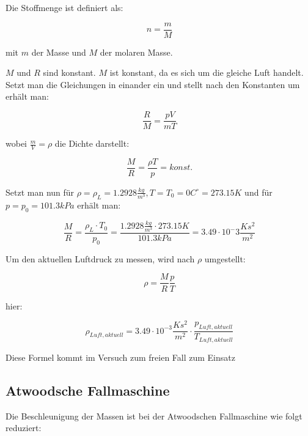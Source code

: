 \documentclass{protokoll}
\begin{document}
Die Stoffmenge ist definiert als:

\begin{equation}
 n = \frac{m}{M} 
\end{equation}



mit $m$ der Masse und $M$ der molaren Masse.

$M$ und $R$ sind konstant. $M$ ist konstant, da es sich 
um die gleiche Luft handelt. Setzt man die Gleichungen 
in einander ein und stellt nach den Konstanten um erhält man:

\begin{equation}
 \frac{R}{M} = \frac{pV}{mT} 
\end{equation}



wobei $\frac{m}{V} = \rho$ die Dichte darstellt:


\begin{equation}
 \frac{M}{R} = \frac{\rho T}{p} = konst.
\end{equation}




Setzt man nun für $ \rho = \rho_L = 1.2928 \frac{kg}{m^3}, 
T = T_0 = 0 C^\circ = 273.15 K $ und für $ p = p_0 = 101.3 kPa $
erhält man:

\begin{equation}
\frac{M}{R} = \frac{\rho_L\cdot T_0}{p_0} = \frac{1.2928 \frac{kg}{m^3}\cdot 273.15 K}{101.3 kPa}
= 3.49\cdot 10^-3 \frac{Ks^2}{m^2} 
\end{equation}



Um den aktuellen Luftdruck zu messen, wird nach $\rho$ umgestellt:

\begin{equation}
 \rho = \frac{M}{R} \frac{p}{T} 
\end{equation}



hier:

\begin{equation}
 \rho_{Luft, aktuell} = 3.49\cdot 10^{-3} \frac{Ks^2}{m^2}\cdot 
\frac{p_{Luft, aktuell}}{T_{Luft, aktuell}} 
\end{equation}



Diese Formel kommt im Versuch zum freien Fall zum Einsatz




\subsection{Atwoodsche Fallmaschine}
Die Beschleunigung der Massen ist bei der Atwoodschen Fallmaschine 
wie folgt reduziert:
\end{document}
